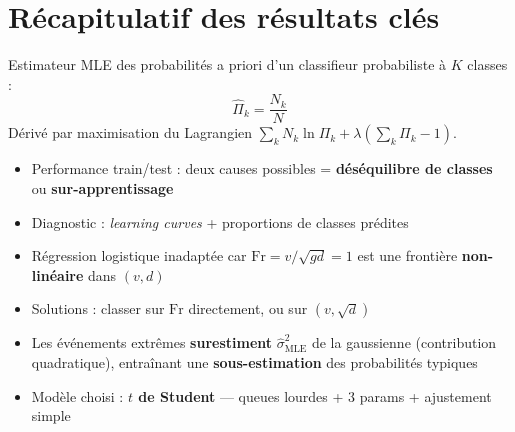 \documentclass[12pt,a4paper]{article}
\begin{document}
\newpage
\section*{Récapitulatif des résultats clés}

\begin{tcolorbox}[colback=bleu!8,colframe=bleu,fonttitle=\bfseries,
  title={Exercice 1 — Bishop 6.4.9}]
Estimateur MLE des probabilités a priori d'un classifieur probabiliste à $K$ classes :
\[
  \hat{\Pi}_k = \frac{N_k}{N}
\]
Dérivé par maximisation du Lagrangien $\sum_k N_k \ln \Pi_k + \lambda\!\left(\sum_k \Pi_k - 1\right)$.
\end{tcolorbox}

\vspace{8pt}

\begin{tcolorbox}[colback=bleu!8,colframe=bleu,fonttitle=\bfseries,
  title={Partie II — Classification d'écoulement}]
\begin{itemize}[itemsep=4pt]
  \item Performance train/test : deux causes possibles =
        \textbf{déséquilibre de classes} ou \textbf{sur-apprentissage}
  \item Diagnostic : \emph{learning curves} + proportions de classes prédites
  \item Régression logistique inadaptée car $\mathrm{Fr}=v/\!\sqrt{gd}=1$
        est une frontière \textbf{non-linéaire} dans $(v,d)$
  \item Solutions : classer sur $\mathrm{Fr}$ directement, ou sur $(v, \sqrt{d})$
\end{itemize}
\end{tcolorbox}

\vspace{8pt}

\begin{tcolorbox}[colback=bleu!8,colframe=bleu,fonttitle=\bfseries,
  title={Exercice 2 — Modélisation de sédiment}]
\begin{itemize}[itemsep=4pt]
  \item Les événements extrêmes \textbf{surestiment} $\hat{\sigma}^2_{\mathrm{MLE}}$ de la gaussienne
        (contribution quadratique), entraînant une \textbf{sous-estimation} des probabilités typiques
  \item Modèle choisi : \textbf{$t$ de Student} — queues lourdes + 3 params + ajustement simple
\end{itemize}
\end{tcolorbox}
\end{document}
